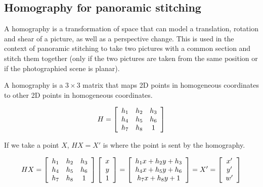 \subsection{Homography for panoramic stitching}\label{subsec:homography}

A homography is a transformation of space that can model a translation, rotation and shear of a picture, as well as a
perspective change.
This is used in the context of panoramic stitching to take two pictures with a common section and stitch them
together (only if the two pictures are taken from the same position or if the photographied scene is planar).

A homography is a $3\times 3$ matrix that maps 2D points in homogeneous coordinates to other 2D points in homogeneous
coordinates.

\begin{equation}\label{eq:homography}
    H=\left[
\begin{array}{c c c}
    h_1 & h_2 & h_3 \\
    h_4 & h_5 & h_6 \\
    h_7 & h_8 & 1
\end{array}
\right]
\end{equation}

If we take a point $X$, $HX=X'$ is where the point is sent by the homography.

\begin{equation}\label{eq:homographyapplication}
    HX=\left[
\begin{array}{c c c}
    h_1 & h_2 & h_3 \\
    h_4 & h_5 & h_6 \\
    h_7 & h_8 & 1
\end{array}
\right]\left[\begin{array}{c}
            x \\ y \\ 1
\end{array}\right]=\left[\begin{array}{c}
            h_1 x + h_2 y + h_3 \\ h_4 x + h_5 y + h_6 \\ h_7 x + h_8 y + 1
\end{array}\right]=X'=\left[
\begin{array}{c}
    x' \\ y' \\ w'
\end{array}\right]
\end{equation}

